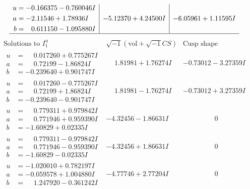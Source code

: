\documentclass[1p]{elsarticle_modified}
\theoremstyle{definition}
\newcommand{\I}{\sqrt{-1}}
\begin{document}
$$\begin{array}{c|c|c}
\begin{aligned}
u &= -0.166375 - 0.760046 I \\
a &= -2.11546 + 1.78936 I \\
b &= \phantom{-}0.611150 - 1.095880 I\end{aligned}
 & -5.12370 + 4.24500 I & -6.05961 + 1.11595 I\\
 \hline 
 \end{array}$$\newpage$$\begin{array}{c|c|c}  
\text{Solutions to }I^u_{1}& \I (\text{vol} + \sqrt{-1}CS) & \text{Cusp shape}\\
 \hline 
\begin{aligned}
u &= \phantom{-}0.017260 + 0.775267 I \\
a &= \phantom{-}0.72199 - 1.86824 I \\
b &= -0.239640 + 0.901747 I\end{aligned}
 & \phantom{-}1.81981 + 1.76274 I & -0.73012 - 3.27359 I \\ \hline\begin{aligned}
u &= \phantom{-}0.017260 - 0.775267 I \\
a &= \phantom{-}0.72199 + 1.86824 I \\
b &= -0.239640 - 0.901747 I\end{aligned}
 & \phantom{-}1.81981 - 1.76274 I & -0.73012 + 3.27359 I \\ \hline\begin{aligned}
u &= \phantom{-}0.779311 + 0.979842 I \\
a &= \phantom{-}0.771946 + 0.959390 I \\
b &= -1.60829 + 0.02335 I\end{aligned}
 & -4.32456 - 1.86631 I & \phantom{-0.000000 } 0 \\ \hline\begin{aligned}
u &= \phantom{-}0.779311 - 0.979842 I \\
a &= \phantom{-}0.771946 - 0.959390 I \\
b &= -1.60829 - 0.02335 I\end{aligned}
 & -4.32456 + 1.86631 I & \phantom{-0.000000 } 0 \\ \hline\begin{aligned}
u &= -1.020010 + 0.782197 I \\
a &= -0.059578 + 1.004880 I \\
b &= \phantom{-}1.247920 - 0.361242 I\end{aligned}
 & -4.77746 + 2.77204 I & \phantom{-0.000000 } 0 \\ \hline\begin{aligned}

\end{aligned}
\end{array}$$
\end{document}
